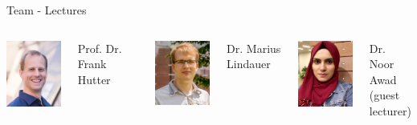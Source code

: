 \begin{frame}[c]{Team - Lectures}

\begin{columns}[T]

\centering
\includegraphics[width=9em]{images/team/frank_small}

Prof. Dr. Frank Hutter

\centering
\includegraphics[width=9em]{images/team/marius}

Dr. Marius Lindauer

\centering
\includegraphics[width=9em]{images/team/awad_small}

Dr. Noor Awad\\
(guest lecturer)


\end{columns}

\end{frame}
